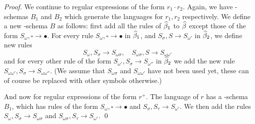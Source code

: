 \documentclass{llncs}
\begin{document}
\begin{proof}
    We continue to regular expressions of the form $r_1\cdot r_2$.
    Again, we have \BR-schemas $B_1$ and $B_2$ which generate the languages for $r_1,r_2$ respectively.
    We define a new \BR-schema $B$ as follows: first add all the rules of $\widehat\beta_1$ to $\widehat\beta$ except those of the form $S_\omega,\square\to\bullet$.
    For every rule $S_\omega,\square\to\bullet$ in $\widehat\beta_1$, and $S_\sigma,S\to S_{\omega'}$ in $\widehat\beta_2$, we define new rules
    \[ S_\omega,S_\sigma \to S_{\omega\sigma},\quad S_{\omega\sigma},S\to S_{\omega\omega'} \]
    and for every other rule of the form $S_{\omega'},S_\sigma\to S_{\omega''}$ in $\widehat\beta_2$ we add the new rule $S_{\omega\omega'},S_\sigma\to S_{\omega\omega''}$.
    (We assume that $S_{\omega\sigma}$ and $S_{\omega\omega'}$ have not been used yet, these can of course be replaced with other symbols otherwise.)

    And now for regular expressions of the form $r^+$.
    The language of $r$ has a \BR-schema $B_1$, which has rules of the form $S_\omega,\square\to\bullet$ and $S_\sigma,S_\tau\to S_{\omega'}$.
    We then add the rules $S_\omega,S_\sigma\to S_{\omega\sigma}$ and $S_{\omega\sigma},S_\tau\to S_{\omega'}$.
    \qed

\end{proof}
\end{document}
